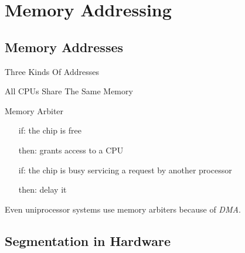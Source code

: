 \mode*


\section{Memory Addressing}

\subsection{Memory Addresses}

\begin{frame}{Three Kinds Of Addresses}
  \begin{center}
  \end{center}
\end{frame}

\begin{frame}[plain]
  \begin{center}
  \end{center}
\end{frame}

\begin{frame}{All CPUs Share The Same Memory}
  \begin{block}{Memory Arbiter}
    \begin{itemize}
    \item[if:] the chip is free
    \item[then:] grants access to a CPU
    \item[if:] the chip is busy servicing a request by another processor
    \item[then:] delay it
    \end{itemize}    
  \end{block}
  Even uniprocessor systems use memory arbiters because of \emph{DMA}.
\end{frame}

\subsection{Segmentation in Hardware}

